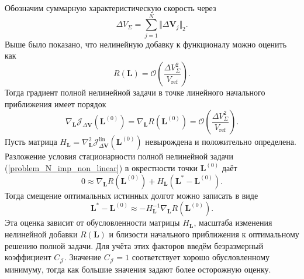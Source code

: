 Обозначим суммарную характеристическую скорость через
\begin{equation}
    \Delta V_{\Sigma} = \sum_{j=1}^N \Vert \Delta \mathbf{V}_j \Vert_2.
\end{equation}
Выше было показано, что нелинейную добавку к функционалу можно оценить как
\begin{equation}
    R(\mathbf{L}) = \mathcal{O} \left( \frac{\Delta V_{\Sigma}^2}{V_{\text{ref}}} \right).
\end{equation}
Тогда градиент полной нелинейной задачи в точке линейного начального приближения имеет порядок
\begin{equation}
    \nabla_{\mathbf{L}} \mathcal{J}_{\Delta \mathbf{V}} (\mathbf{L}^{(0)}) = 
    \nabla_{\mathbf{L}} R (\mathbf{L}^{(0)}) = 
    \mathcal{O} \left( \frac{\Delta V_{\Sigma}^2}{V_{\text{ref}}} \right).
\end{equation}
Пусть матрица $H_{\mathbf{L}} = \nabla_{\mathbf{L}}^2 \mathcal{J}_{\Delta \mathbf{V}}^{\text{lin}} (\mathbf{L}^{(0)})$ невырождена и положительно определена. Разложение условия стационарности полной нелинейной задачи (\ref{problem_N_imp_non_linear}) в окрестности точки $\mathbf{L}^{(0)}$ даёт  
\begin{equation}
    0 \approx
    \nabla_{\mathbf{L}} R (\mathbf{L}^{(0)}) + H_{\mathbf{L}} \left( \mathbf{L}^* - \mathbf{L}^{(0)} \right).
\end{equation}
Тогда смещение оптимальных истинных долгот можно записать в виде
\begin{equation}
    \mathbf{L}^* - \mathbf{L}^{(0)} \approx
    -H_{\mathbf{L}}^{-1} \nabla_{\mathbf{L}} R (\mathbf{L}^{(0)}).
\end{equation}
Эта оценка зависит от обусловленности матрицы $H_{\mathbf{L}}$, масштаба изменения нелинейной добавки $R(\mathbf{L})$ и близости начального приближения к оптимальному решению полной задачи. Для учёта этих факторов введём безразмерный коэффициент $C_\mathcal{J}$. Значение $C_\mathcal{J} = 1$ соответствует хорошо обусловленному минимуму, тогда как большие значения задают более осторожную оценку. 

